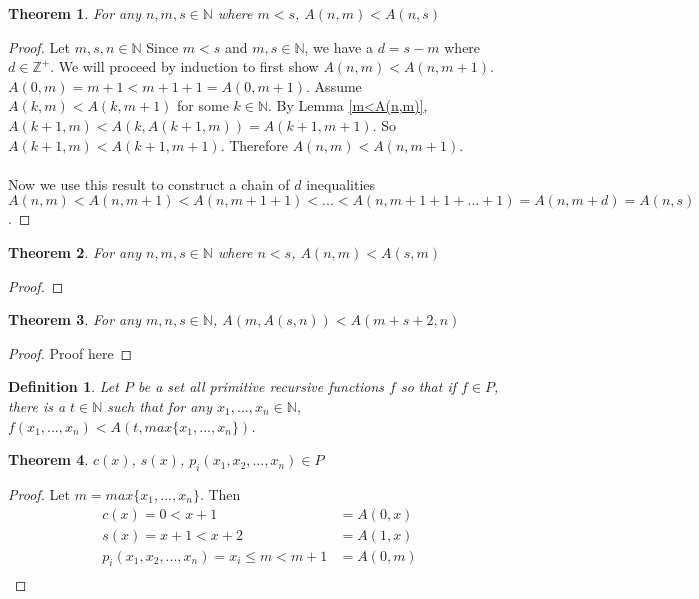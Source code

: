 \documentclass[12pt, letterpaper]{article}
\newtheorem{theorem}{Theorem}
\newtheorem*{definition}{Definition}
\theoremstyle{case}
\begin{document}
    \begin{theorem}
      \label{lt}
      For any $n, m, s \in \mathbb{N}$ where $m < s$, $A(n, m) < A(n, s)$
    \end{theorem}
    \begin{proof}
      Let $m, s, n \in \mathbb{N}$
      Since $m < s$ and $m, s \in \mathbb{N}$, we have a $d = s - m$ where $d \in \mathbb{Z}^+$.
      We will proceed by induction to first show $A(n, m) < A(n, m + 1)$.
      $A(0, m) = m + 1 < m + 1 + 1 = A(0, m + 1)$.
      Assume $A(k, m) < A(k, m + 1)$ for some $k \in \mathbb{N}$.
      By Lemma \ref{m<A(n,m)}, $A(k + 1, m) < A(k, A(k + 1, m)) = A(k + 1, m + 1)$.
      So $A(k + 1, m) < A(k + 1, m + 1)$.
      Therefore $A(n, m) < A(n, m + 1)$.
      \\
      \\
      Now we use this result to construct a chain of $d$ inequalities $A(n, m) < A(n, m + 1) < A(n, m + 1 + 1) < ... < A(n, m + 1 + 1 + ... + 1)
      = A(n, m + d) = A(n, s)$. 
    \end{proof}

    \begin{theorem}
      For any $n, m, s \in \mathbb{N}$ where $n < s$, $A(n, m) < A(s, m)$
    \end{theorem}
    \begin{proof}
    \end{proof}

    \begin{theorem}
      \label{plus2}
      For any $m, n, s \in \mathbb{N}$, $A(m, A(s, n)) < A(m + s + 2, n)$
    \end{theorem}
    \begin{proof}
      Proof here
    \end{proof}
    
    \begin{definition}
      Let $P$ be a set all primitive recursive functions $f$ so that if $f \in P$, there is a $t \in \mathbb{N}$
      such that for any $x_1, ..., x_n \in \mathbb{N}$, $f(x_1, ..., x_n) < A(t, max\{x_1, ..., x_n\})$.
    \end{definition}

    \begin{theorem}
      $c(x)$, $s(x)$, $p_i(x_1, x_2, ..., x_n) \in P$
    \end{theorem}
    \begin{proof}
      Let $m = max\{x_1, ..., x_n\}$.
      Then
      \begin{equation*}
        \begin{aligned}
          c(x) = 0 < x + 1 &= A(0, x) \\
          s(x) = x + 1 < x + 2 &= A(1, x) \\
          p_i(x_1, x_2, ..., x_n) = x_i \leq m < m + 1 &= A(0, m) \\
        \end{aligned}
      \end{equation*}
    \end{proof}
\end{document}
